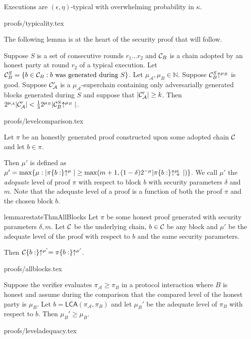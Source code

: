 \begin{theorem}[Typicality]
\label{thm.typicality}
Executions are $(\epsilon, \eta)$-typical with overwhelming
probability in $\kappa$.
\end{theorem}
{proofs/typicality.tex}

The following lemma is at the heart of the security proof that will follow.

\begin{lemma}\label{lem.level-comparison}
    Suppose $S$ is a set of consecutive rounds $r_1 \ldots r_2$
    and $\mathcal{C}_B$ is
    a chain adopted by an honest party at round $r_2$ of a typical execution.
    Let $\mathcal{C}_B^S = \{b \in
    \mathcal{C}_B: b \textnormal{ was generated during } S\}$. Let $\mu_\mathcal{A},
    \mu_B \in \mathbb{N}$. Suppose $\mathcal{C}_B^S\negthickspace\uparrow^{\mu_B}$ is good.
    Suppose $\mathcal{C}'_\mathcal{A}$ is a $\mu_\mathcal{A}$-superchain containing
    only adversarially generated blocks generated during $S$ and suppose that
    $|\mathcal{C}'_\mathcal{A}| \geq k$.
    Then
    $2^{\mu_\mathcal{A}}|\mathcal{C}'_\mathcal{A}| < \frac{1}{3}2^{\mu_B}|\mathcal{C}_B^S\negthickspace\uparrow^{\mu_B}|$.
\end{lemma}
{proofs/levelcomparison.tex}

\begin{definition}
Let $\pi$ be an honestly generated proof constructed upon some adopted chain
$\mathcal{C}$ and let $b \in \pi$.

Then $\mu'$ is defined as  $\mu' = \max\{\mu: |\pi\{b:\}\negthickspace\uparrow^\mu| \geq
\max(m + 1, (1 - \delta)2^{-\mu}|\pi\{b:\}\negthickspace\uparrow^\mu\negthickspace\downarrow\,|)\}$.
We call $\mu'$ the \textit{adequate} level of proof $\pi$ with respect to
block $b$ with security parameters $\delta$ and $m$. Note that the adequate
level of a proof is a function of both the proof $\pi$ and the chosen block $b$.
\end{definition}

\begin{restatable}{lemma}{restateThmAllBlocks}\label{lem.allblocks}
Let $\pi$ be some honest proof generated with security parameters $\delta, m$.
Let $\mathcal{C}$ be the underlying chain, $b \in \mathcal{C}$ be any block and $\mu'$ be
the adequate level of the proof with respect to $b$ and the same security
parameters.

Then $\mathcal{C}\{b:\}\negthickspace\uparrow^{\mu'} = \pi\{b:\}\negthickspace\uparrow^{\mu'}$.
\end{restatable}
{proofs/allblocks.tex}

\begin{lemma}
Suppose the verifier evaluates $\pi_\mathcal{A} \geq \pi_B$ in a protocol
interaction where $B$ is honest and assume during the comparison that the
compared level of the honest party is $\mu_B$. Let $b =
\textsf{LCA}(\pi_\mathcal{A}, \pi_B)$ and let $\mu_B'$ be the adequate
level of $\pi_B$ with respect to $b$. Then $\mu_B' \geq \mu_B$.
\end{lemma}
{proofs/leveladequacy.tex}

